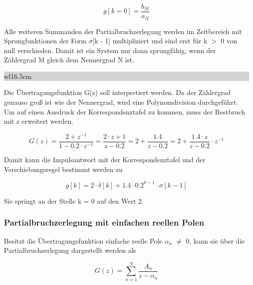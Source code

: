 \begin{equation}\label{eq:sixseightysix}
g\left[k=0\right]=\frac{b_{M} }{a_{N}}
\end{equation}

\noindent Alle weiteren Summanden der Partialbruchzerlegung werden im Zeitbereich mit Sprungfunktionen der Form $\sigma$[k - 1] multipliziert und sind erst f\"{u}r k $\mathrm{>}$ 0 von null verschieden. Damit ist ein System nur dann sprungf\"{a}hig, wenn der Z\"{a}hlergrad M gleich dem Nennergrad N ist. \bigskip

\noindent
\colorbox{lightgray}{%
%
\renewcommand\arraystretch{0.6}%
\begin{tabular}{ wl{16.5cm} }
{}
\end{tabular}%
}\medskip

\noindent Die \"{U}bertragungsfunktion G(z) soll interpretiert werden. Da der Z\"{a}hlergrad genauso gro{\ss} ist wie der Nennergrad, wird eine Polynomdivision durchgef\"{u}hrt. Um auf einen Ausdruck der Korrespondenztafel zu kommen, muss der Restbruch mit z erweitert werden.

\begin{equation}\label{eq:sixseightyseven}
G\left(z\right)=\frac{2+z^{-1} }{1-0.2\cdot z^{-1} } =\frac{2\cdot z+1}{z-0.2} =2+\frac{1.4}{z-0.2} =2+\frac{1.4\cdot z}{z-0.2} \cdot z^{-1}
\end{equation}

\noindent Damit kann die Impulsantwort mit der Korrespondenztafel und der Verschiebungsregel bestimmt werden zu

\begin{equation}\label{eq:sixseightyeight}
g\left[k\right]=2\cdot \delta \left[k\right]+1.4\cdot 0.2^{k-1} \cdot \sigma \left[k-1\right]
\end{equation}

\noindent Sie springt an der Stelle k = 0 auf den Wert 2.

\subsubsection{Partialbruchzerlegung mit einfachen reellen Polen}

\noindent Besitzt die \"{U}bertragungsfunktion einfache reelle Pole $\alpha_{n}$ $\neq$ 0, kann sie \"{u}ber die Partialbruchzerlegung dargestellt werden als

\begin{equation}\label{eq:sixseightynine}
G\left(z\right)=\sum _{n=1}^{N}\frac{A_{n} }{z-\alpha _{n}}
\end{equation}


